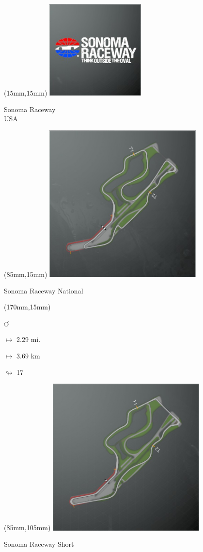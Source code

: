 \begin{textblock*}{60mm}(15mm,15mm)%
\includegraphics[width=50mm]{LG/2015-05-20_00096.png}
\par Sonoma Raceway\\ USA
\end{textblock*}
\begin{textblock*}{80mm}(85mm,15mm)%
\includegraphics[width=80mm]{TR/2015-05-20_00064.png}
\centerline{Sonoma Raceway National}
\end{textblock*}
\begin{textblock*}{30mm}(170mm,15mm)%
\par \Huge$\circlearrowleft$
\Large
\par$\mapsto$ 2.29 mi.
\par$\mapsto$ 3.69 km
\par$\looparrowright$ 17
\end{textblock*}
\begin{textblock*}{80mm}(85mm,105mm)%
\includegraphics[width=80mm]{TR/2015-05-20_00063.png}
\centerline{Sonoma Raceway Short}
\end{textblock*}
